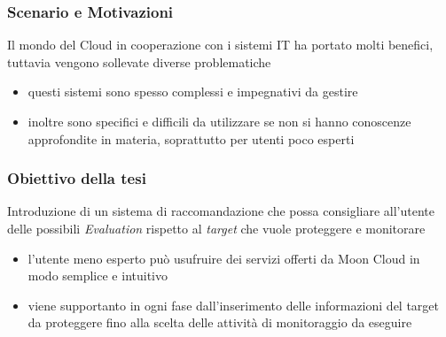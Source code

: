 \frame{\titlepage}

\begin{frame}
    \frametitle{Scenario e Motivazioni}
    Il mondo del Cloud in cooperazione con i sistemi IT ha portato molti benefici, tuttavia vengono sollevate diverse problematiche
    \begin{itemize}
        \item questi sistemi sono spesso \alert{complessi e impegnativi da gestire}
        \item inoltre sono specifici e \alert{difficili da utilizzare} se non si hanno conoscenze approfondite in materia, 
        soprattutto per utenti poco esperti
    \end{itemize}
\end{frame}

\begin{frame}
    \frametitle{Obiettivo della tesi}
    Introduzione di un \alert{sistema di raccomandazione} che possa consigliare all'utente delle possibili \textit{Evaluation} rispetto 
    al \textit{target} che vuole proteggere e monitorare
    \begin{itemize}
        \item l'utente meno esperto può usufruire dei servizi offerti da Moon Cloud in modo \alert{semplice} e \alert{intuitivo} 
        \item viene supportanto in ogni fase dall'inserimento delle informazioni del target da proteggere fino alla scelta delle 
        attività di monitoraggio da eseguire
    \end{itemize}
\end{frame}

